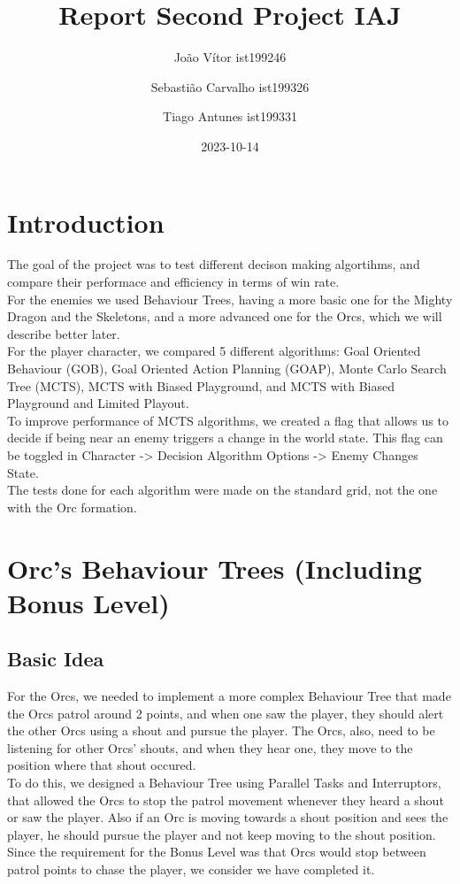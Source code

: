 \documentclass{article}
\title{Report Second Project IAJ}
\author{João Vítor ist199246
  \and Sebastião Carvalho ist199326
  \and Tiago Antunes ist199331}
\date{2023-10-14}
\begin{document}
  \maketitle
  \tableofcontents
  \newpage
  \section{Introduction}
  The goal of the project was to test different decison making algortihms, and compare their performace and efficiency in terms of win rate. \\
  For the enemies we used Behaviour Trees, having a more basic one for the Mighty Dragon and the Skeletons, and a more advanced one for the Orcs, 
  which we will describe better later.\\
  For the player character, we compared 5 different algorithms: Goal Oriented Behaviour (GOB), Goal Oriented Action Planning (GOAP), Monte Carlo Search Tree (MCTS),
  MCTS with Biased Playground, and MCTS with Biased Playground and Limited Playout.\\
  To improve performance of MCTS algorithms, we created a flag that allows us to decide if being near an enemy triggers a change in the world state. 
  This flag can be toggled in Character -> Decision Algorithm Options -> Enemy Changes State. \\
  The tests done for each algorithm were made on the standard grid, not the one with the Orc formation.
  \section{Orc's Behaviour Trees (Including Bonus Level)}
  \subsection{Basic Idea}
  For the Orcs, we needed to implement a more complex Behaviour Tree that made the Orcs patrol around 2 points, and when one saw the player, they should alert the other Orcs
  using a shout and pursue the player. The Orcs, also, need to be listening for other Orcs' shouts, and when they hear one, they move to the position where that shout occured. \\
  To do this, we designed a Behaviour Tree using Parallel Tasks and Interruptors, that allowed the Orcs to stop the patrol movement whenever they heard a shout or 
  saw the player. Also if an Orc is moving towards a shout position and sees the player, he should pursue the player and not keep moving to the shout position.\\
  Since the requirement for the Bonus Level was that Orcs would stop between patrol points to chase the player, we consider we have completed it.
\end{document}
